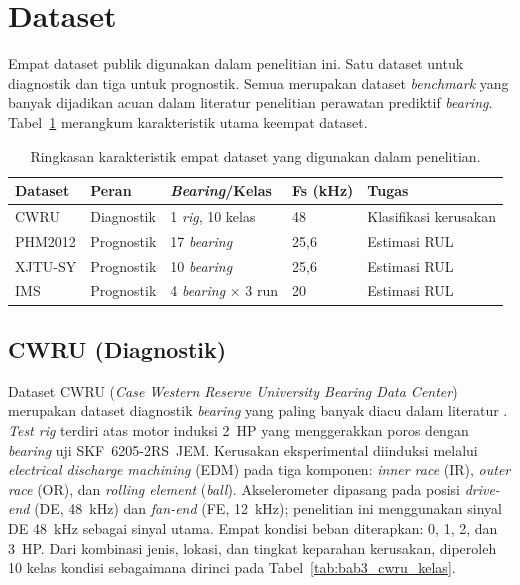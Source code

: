\section{Dataset}
\label{sec:bab3_dataset}

Empat dataset publik digunakan dalam penelitian ini. Satu dataset untuk {\color{blue}diagnostik}
dan tiga untuk {\color{blue}prognostik}. Semua merupakan dataset \emph{benchmark} yang banyak
dijadikan acuan dalam literatur penelitian perawatan prediktif \emph{bearing}.
Tabel~\ref{tab:bab3_dataset_ringkasan} merangkum karakteristik utama
keempat dataset.

\begin{table}[ht]
\centering
\caption{Ringkasan karakteristik empat dataset yang digunakan dalam penelitian.}
\label{tab:bab3_dataset_ringkasan}
\small
\begin{tabular}{@{}lllll@{}}
\toprule
\textbf{Dataset} & \textbf{{\color{blue}Peran}} & \textbf{\emph{Bearing}/Kelas} & \textbf{Fs (kHz)} & \textbf{Tugas} \\
\midrule
CWRU    & {\color{blue}Diagnostik}  & 1 \emph{rig}, 10 kelas & 48   & Klasifikasi kerusakan \\
PHM2012 & {\color{blue}Prognostik}  & 17 \emph{bearing}            & 25,6 & Estimasi RUL \\
XJTU-SY & {\color{blue}Prognostik}  & 10 \emph{bearing}            & 25,6 & Estimasi RUL \\
IMS     & {\color{blue}Prognostik}  & 4 \emph{bearing} × 3 run     & 20   & Estimasi RUL \\
\bottomrule
\end{tabular}
\end{table}

\subsection{CWRU {\color{blue}(Diagnostik)}}
\label{subsec:bab3_cwru}

Dataset CWRU (\emph{Case Western Reserve University Bearing Data Center})
merupakan dataset diagnostik \emph{bearing} yang paling banyak diacu dalam literatur
. \emph{Test rig} terdiri atas motor induksi 2~HP
yang menggerakkan poros dengan \emph{bearing} uji SKF~6205-2RS~JEM. Kerusakan
eksperimental diinduksi melalui \emph{electrical discharge machining} (EDM)
pada tiga komponen: \emph{inner race} (IR), \emph{outer race} (OR), dan
\emph{rolling element} (\emph{ball}). Akselerometer dipasang pada posisi
\emph{drive-end} (DE, 48~kHz) dan \emph{fan-end} (FE, 12~kHz); penelitian
ini menggunakan sinyal DE 48~kHz sebagai sinyal utama. Empat kondisi beban
diterapkan: 0, 1, 2, dan 3~HP. Dari kombinasi jenis, lokasi, dan tingkat
keparahan kerusakan, diperoleh 10 kelas kondisi sebagaimana dirinci pada
Tabel~\ref{tab:bab3_cwru_kelas}.

